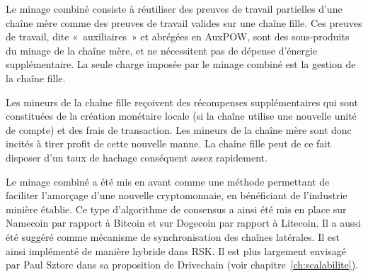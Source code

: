 %
%
%

Le minage combiné consiste à réutiliser des preuves de travail partielles d'une chaîne mère comme des preuves de travail valides sur une chaîne fille. Ces preuves de travail, dite «~auxiliaires~» et abrégées en AuxPOW, sont des sous-produits du minage de la chaîne mère, et ne nécessitent pas de dépense d'énergie supplémentaire. La seule charge imposée par le minage combiné est la gestion de la chaîne fille.

Les mineurs de la chaîne fille reçoivent des récompenses supplémentaires qui sont constituées de la création monétaire locale (si la chaîne utilise une nouvelle unité de compte) et des frais de transaction. Les mineurs de la chaîne mère sont donc incités à tirer profit de cette nouvelle manne. La chaîne fille peut de ce fait disposer d'un taux de hachage conséquent assez rapidement.

Le minage combiné a été mis en avant comme une méthode permettant de faciliter l'amorçage d'une nouvelle cryptomonnaie, en bénéficiant de l'industrie minière établie. Ce type d'algorithme de consensus a ainsi été mis en place sur Namecoin par rapport à Bitcoin et sur Dogecoin par rapport à Litecoin. Il a aussi été suggéré comme mécanisme de synchronisation des chaînes latérales. Il est ainsi implémenté de manière hybride dans RSK. Il est plus largement envisagé par Paul Sztorc dans sa proposition de Drivechain (voir chapitre~\ref{ch:scalabilite}).

